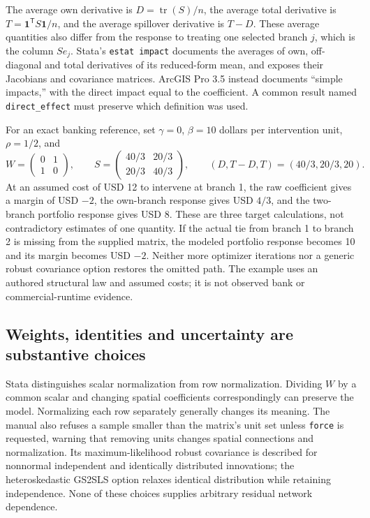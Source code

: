 The average own derivative is $D=\operatorname{tr}(S)/n$, the average total
derivative is $T=\boldsymbol{1}^{\mathsf T}S\boldsymbol{1}/n$, and the
average spillover derivative is $T-D$. These average quantities also differ from
the response to treating one selected branch $j$, which is the column $S e_j$.
Stata's \texttt{estat impact} documents the averages of own, off-diagonal and
total derivatives of its reduced-form mean, and exposes their Jacobians and
covariance matrices. ArcGIS Pro 3.5 instead documents ``simple impacts,'' with
the direct impact equal to the coefficient. A common result named
\texttt{direct\_effect} must preserve which definition was used.
\citep{exec20_network_stata_impacts,exec20_network_arcgis_method}

For an exact banking reference, set $\gamma=0$, $\beta=10$ dollars per
intervention unit, $\rho=1/2$, and
\begin{equation}
 W=\begin{pmatrix}0&1\\1&0\end{pmatrix},\qquad
 S=\begin{pmatrix}40/3&20/3\\20/3&40/3\end{pmatrix},\qquad
 (D,T-D,T)=(40/3,20/3,20).
 \label{exec20:network-feedback}
\end{equation}
At an assumed cost of USD 12 to intervene at branch 1, the raw coefficient
gives a margin of USD $-2$, the own-branch response gives USD $4/3$, and the
two-branch portfolio response gives USD 8. These are three target calculations,
not contradictory estimates of one quantity. If the actual tie from branch 1
to branch 2 is missing from the supplied matrix, the modeled portfolio response
becomes 10 and its margin becomes USD $-2$. Neither more optimizer iterations
nor a generic robust covariance option restores the omitted path. The example
uses an authored structural law and assumed costs; it is not observed bank or
commercial-runtime evidence. \citep{exec20_network_reference}

\subsection{Weights, identities and uncertainty are substantive choices}
\label{exec20:network-weights}

Stata distinguishes scalar normalization from row normalization. Dividing $W$
by a common scalar and changing spatial coefficients correspondingly can
preserve the model. Normalizing each row separately generally changes its
meaning. The manual also refuses a sample smaller than the matrix's unit set
unless \texttt{force} is requested, warning that removing units changes spatial
connections and normalization. Its maximum-likelihood robust covariance is
described for nonnormal independent and identically distributed innovations;
the heteroskedastic GS2SLS option relaxes identical distribution while retaining
independence. None of these choices supplies arbitrary residual network
dependence. \citep{exec20_network_stata_spregress}

